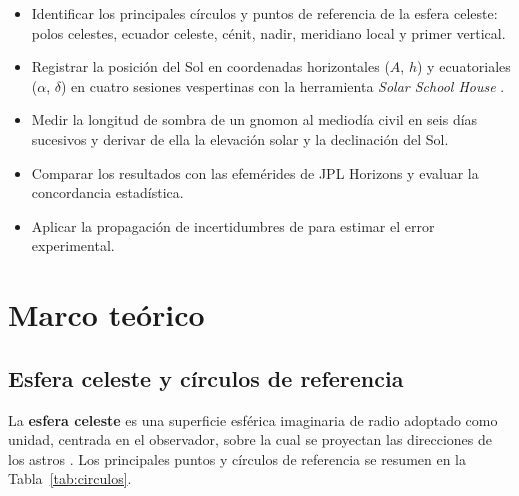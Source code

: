 \begin{itemize}
  \item Identificar los principales círculos y puntos de referencia de la esfera celeste:
        polos celestes, ecuador celeste, cénit, nadir, meridiano local y primer vertical.
  \item Registrar la posición del Sol en coordenadas horizontales ($A$, $h$) y
        ecuatoriales ($\alpha$, $\delta$) en cuatro sesiones vespertinas con la
        herramienta \textit{Solar School House} \citep{SolarSchoolHouse2026}.
  \item Medir la longitud de sombra de un gnomon al mediodía civil en seis días sucesivos
        y derivar de ella la elevación solar y la declinación del Sol.
  \item Comparar los resultados con las efemérides de JPL Horizons \citep{Giorgini1996}
        y evaluar la concordancia estadística.
  \item Aplicar la propagación de incertidumbres de \citet{Baird1991} para estimar el
        error experimental.
\end{itemize}

\section{Marco teórico}

\subsection{Esfera celeste y círculos de referencia}

La \textbf{esfera celeste} es una superficie esférica imaginaria de radio adoptado como
unidad, centrada en el observador, sobre la cual se proyectan las direcciones de los
astros \citep{PortillaBarbosa2009}.
Los principales puntos y círculos de referencia se resumen en la
Tabla~\ref{tab:circulos}.

